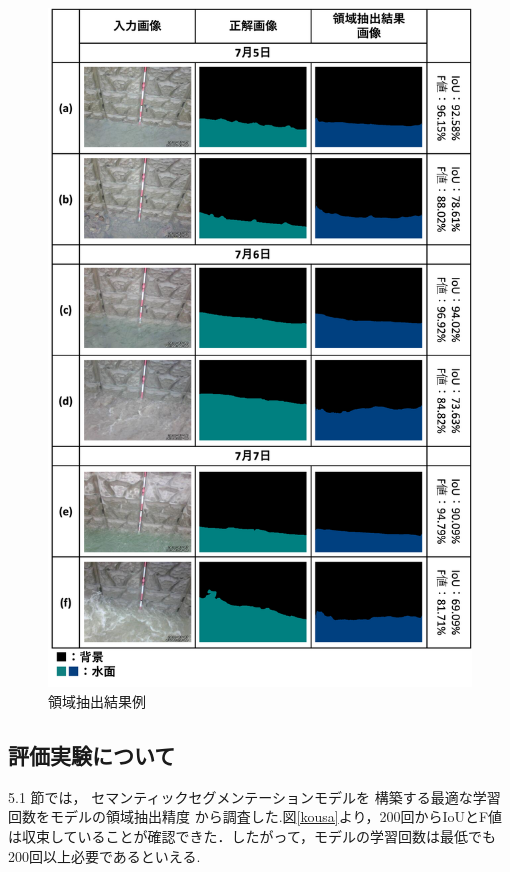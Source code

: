 \begin{figure}[t] 
  \begin{center}
    \includegraphics[width=120mm]{image/image_kousa.png}
  \end{center}
  \caption{領域抽出結果例}
  \label{images_kousa}
\end{figure}

\clearpage
\subsection{評価実験について}

5.1 節では，
セマンティックセグメンテーションモデルを
構築する最適な学習回数をモデルの領域抽出精度
から調査した.図\ref{kousa}より，200回からIoUとF値
は収束していることが確認できた．したがって，モデルの学習回数は最低でも
200回以上必要であるといえる.

